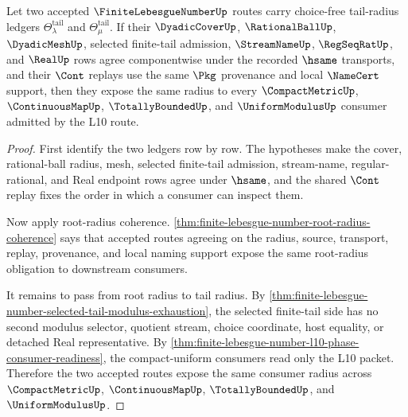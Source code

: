 \begin{theorem}
\label{thm:finite-lebesgue-number-tail-radius-transport-determinacy}
Let two accepted $\FiniteLebesgueNumberUp$ routes carry choice-free tail-radius ledgers $\Theta_{\lambda}^{\mathrm{tail}}$ and $\Theta_{\mu}^{\mathrm{tail}}$. If their $\DyadicCoverUp$, $\RationalBallUp$, $\DyadicMeshUp$, selected finite-tail admission, $\StreamNameUp$, $\RegSeqRatUp$, and $\RealUp$ rows agree componentwise under the recorded $\hsame$ transports, and their $\Cont$ replays use the same $\Pkg$ provenance and local $\NameCert$ support, then they expose the same radius to every $\CompactMetricUp$, $\ContinuousMapUp$, $\TotallyBoundedUp$, and $\UniformModulusUp$ consumer admitted by the L10 route.
\end{theorem}
\begin{proof}
First identify the two ledgers row by row. The hypotheses make the cover, rational-ball radius, mesh, selected finite-tail admission, stream-name, regular-rational, and Real endpoint rows agree under $\hsame$, and the shared $\Cont$ replay fixes the order in which a consumer can inspect them.

Now apply root-radius coherence. \autoref{thm:finite-lebesgue-number-root-radius-coherence} says that accepted routes agreeing on the radius, source, transport, replay, provenance, and local naming support expose the same root-radius obligation to downstream consumers.

It remains to pass from root radius to tail radius. By \autoref{thm:finite-lebesgue-number-selected-tail-modulus-exhaustion}, the selected finite-tail side has no second modulus selector, quotient stream, choice coordinate, host equality, or detached Real representative. By \autoref{thm:finite-lebesgue-number-l10-phase-consumer-readiness}, the compact-uniform consumers read only the L10 packet. Therefore the two accepted routes expose the same consumer radius across $\CompactMetricUp$, $\ContinuousMapUp$, $\TotallyBoundedUp$, and $\UniformModulusUp$.
\end{proof}

